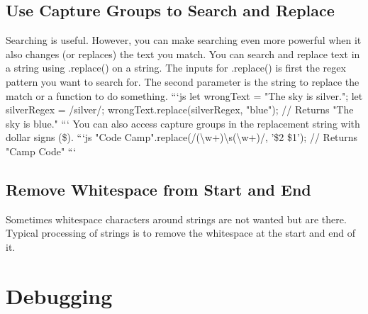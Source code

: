 \documentclass{article}%
\begin{document}
%
\subsection{Use Capture Groups to Search and Replace}%
\label{subsec:UseCaptureGroupstoSearchandReplace}%
Searching is useful. However, you can make searching even more powerful when it also changes (or replaces) the text you match.\newline%
You can search and replace text in a string using .replace() on a string. The inputs for .replace() is first the regex pattern you want to search for. The second parameter is the string to replace the match or a function to do something.\newline%
```js\newline%
let wrongText = "The sky is silver.";\newline%
let silverRegex = /silver/;\newline%
wrongText.replace(silverRegex, "blue");\newline%
// Returns "The sky is blue."\newline%
```\newline%
You can also access capture groups in the replacement string with dollar signs (\$).\newline%
```js\newline%
"Code Camp".replace(/(\textbackslash{}w+)\textbackslash{}s(\textbackslash{}w+)/, '\$2 \$1');\newline%
// Returns "Camp Code"\newline%
```\newline%

%
\subsection{Remove Whitespace from Start and End}%
\label{subsec:RemoveWhitespacefromStartandEnd}%
Sometimes whitespace characters around strings are not wanted but are there. Typical processing of strings is to remove the whitespace at the start and end of it.\newline%

%
\newpage%
\section{Debugging}%
\label{sec:Debugging}%
\end{document}
